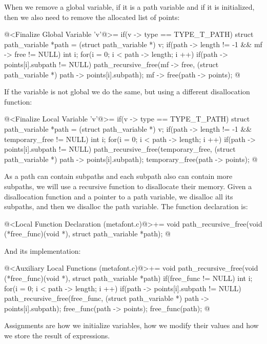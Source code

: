 When we remove a global variable, if it is a path variable and if it
is initialized, then we also need to remove the allocated list of
points:

\iniciocodigo
@<Finalize Global Variable 'v'@>=
if(v -> type == TYPE_T_PATH){
  struct path_variable *path = (struct path_variable *) v;
  if(path -> length != -1 && mf -> free != NULL){
    int i;
    for(i = 0; i < path -> length; i ++)
      if(path -> points[i].subpath != NULL)
        path_recursive_free(mf -> free, (struct path_variable *)
                                        path -> points[i].subpath);
    mf -> free(path -> points);
  }
}
@
\fimcodigo

If the variable is not global we do the same, but using a different
disallocation function:

\iniciocodigo
@<Finalize Local Variable 'v'@>=
if(v -> type == TYPE_T_PATH){
  struct path_variable *path = (struct path_variable *) v;
  if(path -> length != -1 && temporary_free != NULL){
    int i;
    for(i = 0; i < path -> length; i ++)
      if(path -> points[i].subpath != NULL)
        path_recursive_free(temporary_free, (struct path_variable *)
                                            path -> points[i].subpath);
    temporary_free(path -> points);
  }
}
@
\fimcodigo

As a path can contain subpaths and each subpath also can contain more
subpaths, we will use a recursive function to disallocate their
memory. Given a disallocation function and a pointer to a path
variable, we disalloc all its subpaths, and then we disalloc the path
variable. The function declaration is:

\iniciocodigo
@<Local Function Declaration (metafont.c)@>+=
void path_recursive_free(void (*free_func)(void *),
                         struct path_variable *path);
@
\fimcodigo

And its implementation:

\iniciocodigo
@<Auxiliary Local Functions (metafont.c)@>+=
void path_recursive_free(void (*free_func)(void *),
                         struct path_variable *path){
  if(free_func != NULL){
    int i;
    for(i = 0; i < path -> length; i ++){
      if(path -> points[i].subpath != NULL)
        path_recursive_free(free_func, (struct path_variable *)
                                       path -> points[i].subpath);
    }
    free_func(path -> points);
    free_func(path);
  }
}
@
\fimcodigo


Assignments are how we initialize variables, how we modify their
values and how we store the result of expressions.

